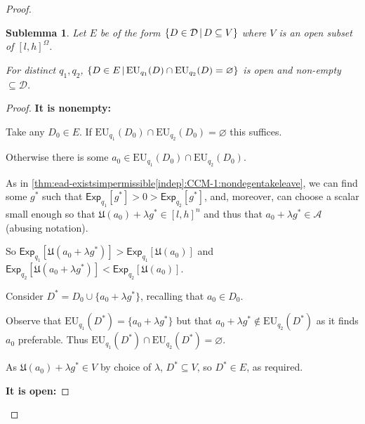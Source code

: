 \documentclass[a4paper]{article}
\newtheorem{sublemma}{Sublemma}[theorem]
\newcommand\A{\mathcal{A}}
\newcommand\Exp{\mathsf{Exp}}
\newcommand\EU{\mathrm{EU}}
\newcommand\U{\mathfrak{U}} %
\newcommand{\D}{\mathcal{D}}
\newcommand{\Decs}{\mathcal{D}}
\newcommand\SetDelimiter[1][]{
	\nonscript\,#1\vert \allowbreak \nonscript\,\mathopen{}}
\providecommand\given{\SetDelimiter}
\renewcommand{\emptyset}{\varnothing}
\newenvironment{CCM rewritten}
{\begingroup\color{blue}} %
{\endgroup}              %
\begin{document}
\begin{proof}
	
	\begin{sublemma}
	Let $E$ be of the form $\{D\in\D\given D\subseteq V\}$ where $V$ is an open subset of $[l,h]^\Omega$.
				
		For distinct $q_1,q_2$, 
		$\{D\in E\given \EU_{q_1}(D)\cap \EU_{q_2}(D)=\emptyset\}$ is open and non-empty $\subseteq\Decs$.
	\end{sublemma}
	\begin{proof}
		
%		
	
	
	\textbf{It is nonempty:}
	
	Take any $D_0\in E$. If $\EU_{q_1}(D_0)\cap \EU_{q_2}(D_0)=\emptyset$ this suffices. 
	
	Otherwise there is some $a_0\in \EU_{q_1}(D_0)\cap \EU_{q_2}(D_0)$. 
	
	As in \cref{thm:ead-existsimpermissible[indep]:CCM-1:nondegentakeleave}, we can find some $g^*$ such that $\Exp_{q_1}[g^*]>0>\Exp_{q_2}[g^*]$, and, moreover, can choose a scalar small enough so that $\U(a_0)+\lambda g^*\in[l,h]^n$ and thus that $a_0+\lambda g^*\in\A$ (abusing notation). 
	
	So $\Exp_{q_1}[\U(a_0+\lambda g^*)]>\Exp_{q_1}[\U(a_0)]$ and $\Exp_{q_2}[\U(a_0+\lambda g^*)]<\Exp_{q_2}[\U(a_0)]$.
	
	Consider $D^*=D_0\cup\{a_0+\lambda g^*\}$, recalling that $a_0\in D_0$. 
	
	Observe that $\EU_{q_1}(D^*)=\{a_0+\lambda g^*\}$ but that $a_0+\lambda g^*\notin\EU_{q_2}(D^*)$ as it finds $a_0$ preferable. 
	Thus $\EU_{q_1}(D^*)\cap \EU_{q_2}(D^*)=\emptyset$.
	
	As $\U(a_0)+\lambda g^*\in V$ by choice of $\lambda$, $D^*\subseteq V$, so $D^*\in E$, as required. 
	
		\textbf{It is open:}
		

\end{proof}
\end{proof}
\end{document}
